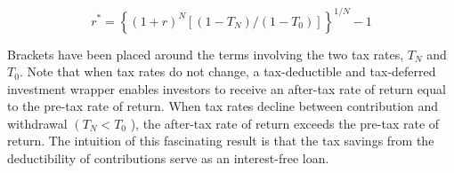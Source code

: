 \documentclass[11pt]{article}
\begin{document}
\begin{equation*}
r^{*}=\left\{(1+r)^{N}\left[\left(1-T_{N}\right) /\left(1-T_{0}\right)\right]\right\}^{1 / N}-1 \tag{3}
\end{equation*}


Brackets have been placed around the terms involving the two tax rates, $T_{N}$ and $T_{0}$. Note that when tax rates do not change, a tax-deductible and tax-deferred investment wrapper enables investors to receive an after-tax rate of return equal to the pre-tax rate of return. When tax rates decline between contribution and withdrawal $\left(T_{N}<T_{0}\right.$ ), the after-tax rate of return exceeds the pre-tax rate of return. The intuition of this fascinating result is that the tax savings from the deductibility of contributions serve as an interest-free loan.
\end{document}
